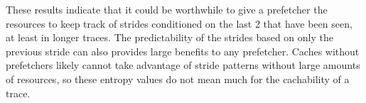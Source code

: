 \documentclass{article}
\begin{document}
These results indicate that it could be worthwhile to give a prefetcher the resources to keep track of strides conditioned on the last 2 that have been seen, at least in longer traces.  The predictability of the strides based on only the previous stride can also provides large benefits to any prefetcher.  Caches without prefetchers likely cannot take advantage of stride patterns without large amounts of resources, so these entropy values do not mean much for the cachability of a trace.
\end{document}
